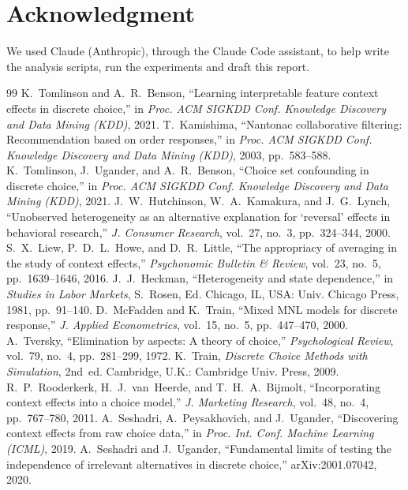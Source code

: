 \documentclass[11pt,journal,a4paper]{IEEEtran}
\begin{document}
\section*{Acknowledgment}
We used Claude (Anthropic), through the Claude Code assistant, to help write the analysis scripts, run the
experiments and draft this report.

\begin{thebibliography}{99}
 K.~Tomlinson and A.~R.~Benson, ``Learning interpretable feature context effects in discrete
  choice,'' in \emph{Proc. ACM SIGKDD Conf. Knowledge Discovery and Data Mining (KDD)}, 2021.
 T.~Kamishima, ``Nantonac collaborative filtering: Recommendation based on order
  responses,'' in \emph{Proc. ACM SIGKDD Conf. Knowledge Discovery and Data Mining (KDD)}, 2003,
  pp.~583--588.
 K.~Tomlinson, J.~Ugander, and A.~R.~Benson, ``Choice set confounding in discrete choice,'' in
  \emph{Proc. ACM SIGKDD Conf. Knowledge Discovery and Data Mining (KDD)}, 2021.
 J.~W.~Hutchinson, W.~A.~Kamakura, and J.~G.~Lynch, ``Unobserved heterogeneity as an
  alternative explanation for `reversal' effects in behavioral research,'' \emph{J. Consumer Research},
  vol.~27, no.~3, pp.~324--344, 2000.
 S.~X.~Liew, P.~D.~L.~Howe, and D.~R.~Little, ``The appropriacy of averaging in the study of
  context effects,'' \emph{Psychonomic Bulletin \& Review}, vol.~23, no.~5, pp.~1639--1646, 2016.
 J.~J.~Heckman, ``Heterogeneity and state dependence,'' in \emph{Studies in Labor
  Markets}, S.~Rosen, Ed. Chicago, IL, USA: Univ. Chicago Press, 1981, pp.~91--140.
 D.~McFadden and K.~Train, ``Mixed MNL models for discrete response,'' \emph{J. Applied
  Econometrics}, vol.~15, no.~5, pp.~447--470, 2000.
 A.~Tversky, ``Elimination by aspects: A theory of choice,'' \emph{Psychological Review},
  vol.~79, no.~4, pp.~281--299, 1972.
 K.~Train, \emph{Discrete Choice Methods with Simulation}, 2nd~ed. Cambridge, U.K.:
  Cambridge Univ. Press, 2009.
 R.~P.~Rooderkerk, H.~J.~van~Heerde, and T.~H.~A.~Bijmolt, ``Incorporating context effects into
  a choice model,'' \emph{J. Marketing Research}, vol.~48, no.~4, pp.~767--780, 2011.
 A.~Seshadri, A.~Peysakhovich, and J.~Ugander, ``Discovering context effects from raw choice
  data,'' in \emph{Proc. Int. Conf. Machine Learning (ICML)}, 2019.
 A.~Seshadri and J.~Ugander, ``Fundamental limits of testing the independence of irrelevant
  alternatives in discrete choice,'' arXiv:2001.07042, 2020.

\end{thebibliography}
\end{document}
